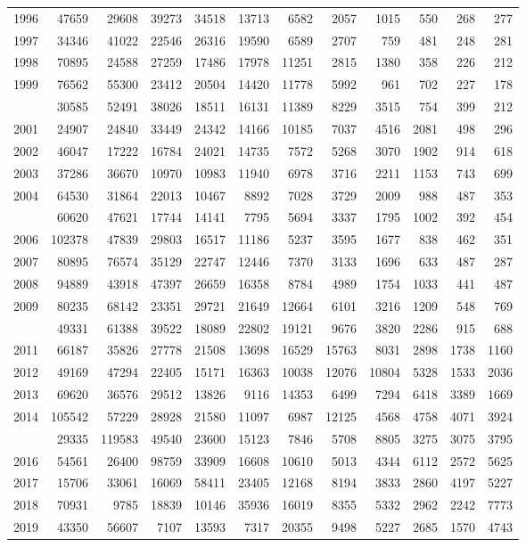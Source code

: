 \documentclass[
]{article}
\begin{document}
\begin{longtable}[t]{lrrrrrrrrrrr}
1996 & 47659 & 29608 & 39273 & 34518 & 13713 & 6582 & 2057 & 1015 & 550 & 268 & 277\\
1997 & 34346 & 41022 & 22546 & 26316 & 19590 & 6589 & 2707 & 759 & 481 & 248 & 281\\
1998 & 70895 & 24588 & 27259 & 17486 & 17978 & 11251 & 2815 & 1380 & 358 & 226 & 212\\
1999 & 76562 & 55300 & 23412 & 20504 & 14420 & 11778 & 5992 & 961 & 702 & 227 & 178\\
\addlinespace
2000 & 30585 & 52491 & 38026 & 18511 & 16131 & 11389 & 8229 & 3515 & 754 & 399 & 212\\
2001 & 24907 & 24840 & 33449 & 24342 & 14166 & 10185 & 7037 & 4516 & 2081 & 498 & 296\\
2002 & 46047 & 17222 & 16784 & 24021 & 14735 & 7572 & 5268 & 3070 & 1902 & 914 & 618\\
2003 & 37286 & 36670 & 10970 & 10983 & 11940 & 6978 & 3716 & 2211 & 1153 & 743 & 699\\
2004 & 64530 & 31864 & 22013 & 10467 & 8892 & 7028 & 3729 & 2009 & 988 & 487 & 353\\
\addlinespace
2005 & 60620 & 47621 & 17744 & 14141 & 7795 & 5694 & 3337 & 1795 & 1002 & 392 & 454\\
2006 & 102378 & 47839 & 29803 & 16517 & 11186 & 5237 & 3595 & 1677 & 838 & 462 & 351\\
2007 & 80895 & 76574 & 35129 & 22747 & 12446 & 7370 & 3133 & 1696 & 633 & 487 & 287\\
2008 & 94889 & 43918 & 47397 & 26659 & 16358 & 8784 & 4989 & 1754 & 1033 & 441 & 487\\
2009 & 80235 & 68142 & 23351 & 29721 & 21649 & 12664 & 6101 & 3216 & 1209 & 548 & 769\\
\addlinespace
2010 & 49331 & 61388 & 39522 & 18089 & 22802 & 19121 & 9676 & 3820 & 2286 & 915 & 688\\
2011 & 66187 & 35826 & 27778 & 21508 & 13698 & 16529 & 15763 & 8031 & 2898 & 1738 & 1160\\
2012 & 49169 & 47294 & 22405 & 15171 & 16363 & 10038 & 12076 & 10804 & 5328 & 1533 & 2036\\
2013 & 69620 & 36576 & 29512 & 13826 & 9116 & 14353 & 6499 & 7294 & 6418 & 3389 & 1669\\
2014 & 105542 & 57229 & 28928 & 21580 & 11097 & 6987 & 12125 & 4568 & 4758 & 4071 & 3924\\
\addlinespace
2015 & 29335 & 119583 & 49540 & 23600 & 15123 & 7846 & 5708 & 8805 & 3275 & 3075 & 3795\\
2016 & 54561 & 26400 & 98759 & 33909 & 16608 & 10610 & 5013 & 4344 & 6112 & 2572 & 5625\\
2017 & 15706 & 33061 & 16069 & 58411 & 23405 & 12168 & 8194 & 3833 & 2860 & 4197 & 5227\\
2018 & 70931 & 9785 & 18839 & 10146 & 35936 & 16019 & 8355 & 5332 & 2962 & 2242 & 7773\\
2019 & 43350 & 56607 & 7107 & 13593 & 7317 & 20355 & 9498 & 5227 & 2685 & 1570 & 4743\\*
\end{longtable}
\end{document}
